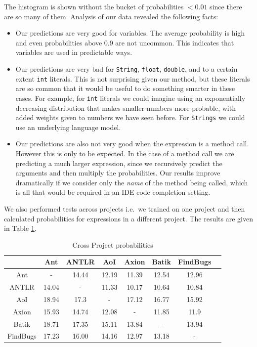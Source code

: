 \documentclass{article} %
\begin{document}
The histogram is shown without the bucket of probabilities $< 0.01$ since there are so many of them. Analysis of our data revealed the following facts:
\begin{itemize}
  \item Our predictions are very good for variables. The average probability is high and even probabilities above 0.9 are not uncommon. This indicates that variables are used in predictable ways.
  \item Our predictions are very bad for \texttt{String}, \texttt{float}, \texttt{double}, and to a certain extent \texttt{int} literals. This is not surprising given our method, but these literals are so common that it would be useful to do something smarter in these cases. For example, for \texttt{int} literals we could imagine using an exponentially decreasing distribution that makes smaller numbers more probable, with added weights given to numbers we have seen before. For \texttt{Strings} we could use an underlying language model.
  \item Our predictions are also not very good when the expression is a method call. However this is only to be expected. In the case of a method call we are predicting a much larger expression, since we recursively predict the arguments and then multiply the probabilities. Our results improve dramatically if we consider only the \emph{name} of the method being called, which is all that would be required in an IDE code completion setting.
\end{itemize}

We also performed tests across projects i.e.\ we trained on one project and then calculated probabilities for expressions in a different project. The results are given in Table \ref{tab:cross}.
\begin{table}[h]
\centering
\begin{tabular}{|c|c|c|c|c|c|c|c|}
\hline
           & Ant   & ANTLR & AoI   & Axion & Batik & FindBugs \\
\hline
 Ant       & -     & 14.44 & 12.19 & 11.39 & 12.54 & 12.96    \\
ANTLR      & 14.04 & -     & 11.33 & 10.17 & 10.64 & 10.84    \\
AoI        & 18.94 & 17.3  & -     & 17.12 & 16.77 & 15.92    \\
Axion      & 15.93 & 14.74 & 12.08 & -     & 11.85 & 11.9     \\
Batik      & 18.71 & 17.35 & 15.11 & 13.84 & -     & 13.94    \\
FindBugs   & 17.23 & 16.00 & 14.16 & 12.97 & 13.18 & -        \\
\hline
\end{tabular}
\caption{Cross Project probabilities}
\label{tab:cross}
\end{table}
\end{document}
